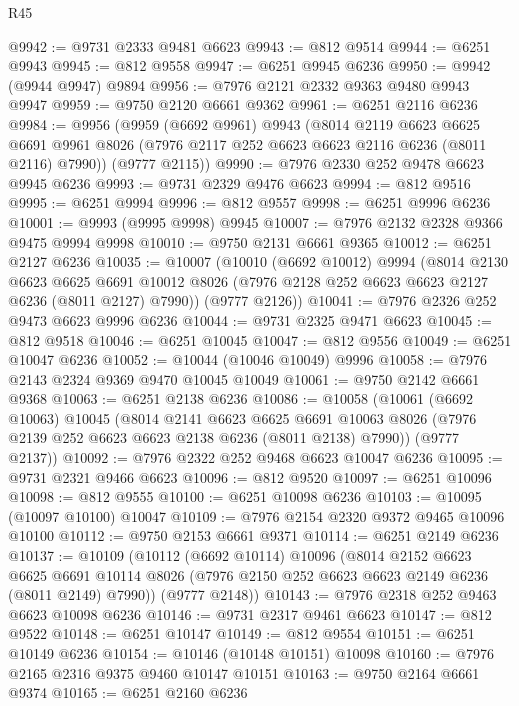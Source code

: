 \begin{lexlean}{R45}
\begin{coremodule}
{@9942 := @9731 @2333 @9481 @6623
@9943 := @812 @9514
@9944 := @6251 @9943
@9945 := @812 @9558
@9947 := @6251 @9945 @6236
@9950 := @9942 (@9944 @9947) @9894
@9956 := @7976 @2121 @2332 @9363 @9480 @9943 @9947
@9959 := @9750 @2120 @6661 @9362
@9961 := @6251 @2116 @6236
@9984 := @9956
    (@9959
      (@6692 @9961)
      @9943
      (@8014
        @2119
        @6623
        @6625
        @6691
        @9961
        @8026
        (@7976 @2117 @252 @6623 @6623 @2116 @6236 (@8011 @2116) @7990))
      (@9777 @2115))
@9990 := @7976 @2330 @252 @9478 @6623 @9945 @6236
@9993 := @9731 @2329 @9476 @6623
@9994 := @812 @9516
@9995 := @6251 @9994
@9996 := @812 @9557
@9998 := @6251 @9996 @6236
@10001 := @9993 (@9995 @9998) @9945
@10007 := @7976 @2132 @2328 @9366 @9475 @9994 @9998
@10010 := @9750 @2131 @6661 @9365
@10012 := @6251 @2127 @6236
@10035 := @10007
    (@10010
      (@6692 @10012)
      @9994
      (@8014
        @2130
        @6623
        @6625
        @6691
        @10012
        @8026
        (@7976 @2128 @252 @6623 @6623 @2127 @6236 (@8011 @2127) @7990))
      (@9777 @2126))
@10041 := @7976 @2326 @252 @9473 @6623 @9996 @6236
@10044 := @9731 @2325 @9471 @6623
@10045 := @812 @9518
@10046 := @6251 @10045
@10047 := @812 @9556
@10049 := @6251 @10047 @6236
@10052 := @10044 (@10046 @10049) @9996
@10058 := @7976 @2143 @2324 @9369 @9470 @10045 @10049
@10061 := @9750 @2142 @6661 @9368
@10063 := @6251 @2138 @6236
@10086 := @10058
    (@10061
      (@6692 @10063)
      @10045
      (@8014
        @2141
        @6623
        @6625
        @6691
        @10063
        @8026
        (@7976 @2139 @252 @6623 @6623 @2138 @6236 (@8011 @2138) @7990))
      (@9777 @2137))
@10092 := @7976 @2322 @252 @9468 @6623 @10047 @6236
@10095 := @9731 @2321 @9466 @6623
@10096 := @812 @9520
@10097 := @6251 @10096
@10098 := @812 @9555
@10100 := @6251 @10098 @6236
@10103 := @10095 (@10097 @10100) @10047
@10109 := @7976 @2154 @2320 @9372 @9465 @10096 @10100
@10112 := @9750 @2153 @6661 @9371
@10114 := @6251 @2149 @6236
@10137 := @10109
    (@10112
      (@6692 @10114)
      @10096
      (@8014
        @2152
        @6623
        @6625
        @6691
        @10114
        @8026
        (@7976 @2150 @252 @6623 @6623 @2149 @6236 (@8011 @2149) @7990))
      (@9777 @2148))
@10143 := @7976 @2318 @252 @9463 @6623 @10098 @6236
@10146 := @9731 @2317 @9461 @6623
@10147 := @812 @9522
@10148 := @6251 @10147
@10149 := @812 @9554
@10151 := @6251 @10149 @6236
@10154 := @10146 (@10148 @10151) @10098
@10160 := @7976 @2165 @2316 @9375 @9460 @10147 @10151
@10163 := @9750 @2164 @6661 @9374
@10165 := @6251 @2160 @6236
}
\end{coremodule}
\end{lexlean}
